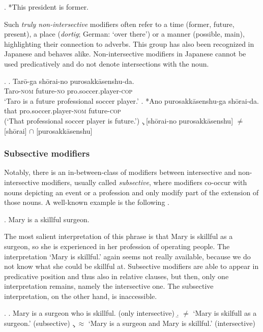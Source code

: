 \documentclass [output=book,colorlinks,citecolor=brown]{langscibook}
\begin{document}
\ex. *This president is former.

Such \textit{truly non-intersective} modifiers often refer to a time (former, future, present), a place (\textit{dortig}; German: `over there’) or a manner (possible, main), highlighting their connection to adverbs. This group has also been recognized in Japanese \citep{yamakido:2005:nature, ayano:2010:revisiting} and behaves alike. Non-intersective modifiers in Japanese cannot be used predicatively and do not denote intersections with the noun.

\ex. \ag. Tarō-ga shōrai-no purosakkāsenshu-da.\\
Taro-\textsc{nom} future-\textsc{no} pro.soccer.player-\textsc{cop}\\
`Taro is a future professional soccer player.’
\bg. *Ano purosakkāsenshu-ga shōrai-da.\\
that pro.soccer.player-\textsc{nom} future-\textsc{cop}\\
(`That professional soccer player is future.’)
\c. [shōrai-no purosakkāsenshu] $\neq$ [shōrai] $\cap$ [purosakkāsenshu]

\subsubsection{Subsective modifiers}

Notably, there is an in-between-class of modifiers between intersective and non-intersective modifiers, usually called \textit{subsective}, where modifiers co-occur with nouns depicting an event or a profession and only modify part of the extension of those nouns. A well-known example is the following \citep[137–138]{kamp:1995:prototype}. %

\ex. Mary is a skillful surgeon.

The most salient interpretation of this phrase is that Mary is skillful as a surgeon, so she is experienced in her profession of operating people. The interpretation `Mary is skillful.’ again seems not really available, because we do not know what she could be skillful at. Subsective modifiers are able to appear in predicative position and thus also in relative clauses, but then, only one interpretation remains, namely the intersective one. The subsective interpretation, on the other hand, is inaccessible.

\ex. \a. Mary is a surgeon who is skillful. (only intersective)
\b. $\neq$ `Mary is skilfull as a surgeon.’ (subsective)
\c. $\approx$ `Mary is a surgeon and Mary is skillful.’ (intersective)
\end{document}
